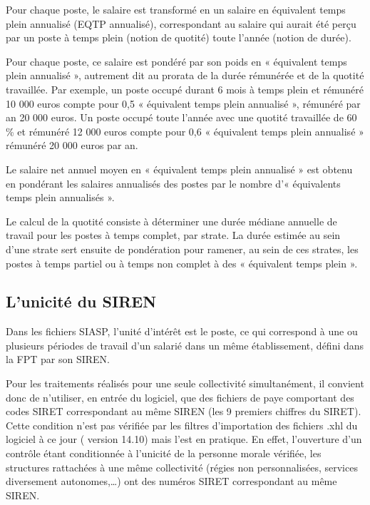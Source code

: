 \documentclass[]{article}
\begin{document}
Pour chaque poste, le salaire est transformé en un salaire en équivalent
temps plein annualisé (EQTP annualisé), correspondant au salaire qui
aurait été perçu par un poste à temps plein (notion de quotité) toute
l'année (notion de durée).

Pour chaque poste, ce salaire est pondéré par son poids en « équivalent
temps plein annualisé », autrement dit au prorata de la durée rémunérée
et de la quotité travaillée. Par exemple, un poste occupé durant 6 mois
à temps plein et rémunéré 10 000 euros compte pour 0,5 « équivalent
temps plein annualisé », rémunéré par an 20 000 euros. Un poste occupé
toute l'année avec une quotité travaillée de 60 \% et rémunéré 12 000
euros compte pour 0,6 « équivalent temps plein annualisé » rémunéré 20
000 euros par an.

Le salaire net annuel moyen en « équivalent temps plein annualisé » est
obtenu en pondérant les salaires annualisés des postes par le nombre d'«
équivalents temps plein annualisés ».

Le calcul de la quotité consiste à déterminer une durée médiane annuelle
de travail pour les postes à temps complet, par strate. La durée estimée
au sein d'une strate sert ensuite de pondération pour ramener, au sein
de ces strates, les postes à temps partiel ou à temps non complet à des
« équivalent temps plein ».

\subsection{L'unicité du SIREN}\label{lunicite-du-siren}

Dans les fichiers SIASP, l'unité d'intérêt est le poste, ce qui
correspond à une ou plusieurs périodes de travail d'un salarié dans un
même établissement, défini dans la FPT par son SIREN.

Pour les traitements réalisés pour une seule collectivité simultanément,
il convient donc de n'utiliser, en entrée du logiciel, que des fichiers
de paye comportant des codes SIRET correspondant au même SIREN (les 9
premiers chiffres du SIRET). Cette condition n'est pas vérifiée par les
filtres d'importation des fichiers .xhl du logiciel à ce jour ( version
14.10) mais l'est en pratique. En effet, l'ouverture d'un contrôle étant
conditionnée à l'unicité de la personne morale vérifiée, les structures
rattachées à une même collectivité (régies non personnalisées, services
diversement autonomes,\ldots{}) ont des numéros SIRET correspondant au
même SIREN.
\end{document}
